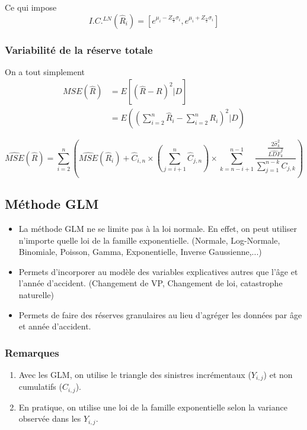 \documentclass[11pt,french]{report}
\begin{document}
Ce qui impose
$$\boxed{I.C.^{LN}(\widehat{R}_i) = \left[e^{\mu_i - Z_{\frac{\alpha}{2}}\sigma_i}, e^{\mu_i + Z_{\frac{\alpha}{2}}\sigma_i} \right]}$$

\subsubsection*{ Variabilité de la réserve totale}

On a tout simplement 
$$\begin{aligned}
MSE(\widehat R) &= E\left[(\widehat{R}-R)^2|D \right] \\
   &= E\left(\left(\sum_{i=2}^n \widehat R_i - \sum_{i=2}^n R_i\right)^2|D \right)
\end{aligned}$$

$$\boxed{\widehat{MSE}(\widehat{R}) = \sum_{i=2}^n \left( \widehat{MSE}(\widehat{R}_i) + \widehat{C}_{i,n} \times \left(\sum_{j=i+1}^n \widehat{C}_{j,n} \right) \times \sum_{k=n-i+1}^{n-1} \frac{\frac{2\widehat{\sigma}_k^2}{\widehat{LDF}_k^2}}{\sum_{j=1}^{n-k} C_{j,k}} \right) }$$

\subsection*{ Méthode GLM}

\begin{itemize}
\item La méthode GLM ne se limite pas à la loi normale. En effet, on peut utiliser n'importe quelle loi de la famille exponentielle. (Normale, Log-Normale, Binomiale, Poisson, Gamma, Exponentielle, Inverse Gaussienne,...)
\item Permets d'incorporer au modèle des variables explicatives autres que l'âge et l'année d'accident. (Changement de VP, Changement de loi, catastrophe naturelle)
\item Permets de faire des réserves granulaires au lieu d'agréger les données par âge et année d'accident.
\end{itemize}

\subsubsection*{Remarques}
\begin{enumerate}
\item Avec les GLM, on utilise le triangle des sinistres incrémentaux ($Y_{i,j}$) et non cumulatifs ($C_{i,j}$).
\item En pratique, on utilise une loi de la famille exponentielle selon la variance observée dans les $Y_{i,j}$.
\end{enumerate}
\end{document}
